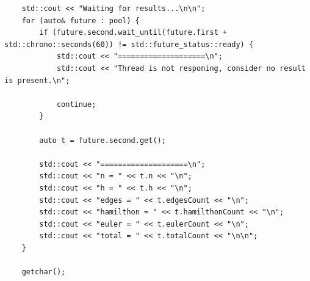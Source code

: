 \documentclass[a4paper,14pt]{extarticle}
\begin{document}
\begin{enumerate}[1.]
\begin{verbatim}
    std::cout << "Waiting for results...\n\n";
    for (auto& future : pool) {
        if (future.second.wait_until(future.first + std::chrono::seconds(60)) != std::future_status::ready) {
            std::cout << "====================\n";
            std::cout << "Thread is not responing, consider no result is present.\n";

            continue;
        }

        auto t = future.second.get();

        std::cout << "====================\n";
        std::cout << "n = " << t.n << "\n";
        std::cout << "h = " << t.h << "\n";
        std::cout << "edges = " << t.edgesCount << "\n";
        std::cout << "hamilthon = " << t.hamilthonCount << "\n";
        std::cout << "euler = " << t.eulerCount << "\n";
        std::cout << "total = " << t.totalCount << "\n\n";
    }

    getchar();


\end{verbatim}
\end{enumerate}
\end{document}
